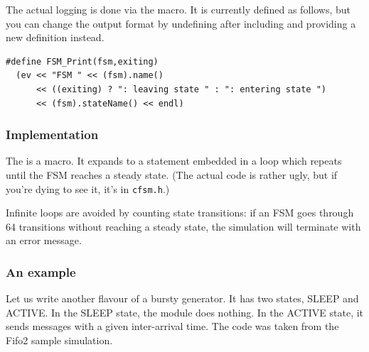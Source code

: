 The actual logging is done via the  macro.
It is currently defined as follows, but you can change the
output format by undefining  after including
 and providing a new definition instead.

\begin{verbatim}
#define FSM_Print(fsm,exiting)
  (ev << "FSM " << (fsm).name()
      << ((exiting) ? ": leaving state " : ": entering state ")
      << (fsm).stateName() << endl)
\end{verbatim}


\subsubsection{Implementation}


The  is a macro. It expands to a 
statement embedded in a  loop which repeats until the
FSM reaches a steady state. (The actual code is rather
ugly, but if you're dying to see it, it's in \texttt{cfsm.h}.)

Infinite loops are avoided by counting state transitions: if
an FSM goes through 64 transitions without reaching a steady
state, the simulation will terminate with an error message.


\subsubsection{An example}


Let us write another flavour of a bursty generator. It has two
states, SLEEP and ACTIVE. In the SLEEP state, the module does
nothing. In the ACTIVE state, it sends messages with a given
inter-arrival time. The code was taken from the Fifo2 sample
simulation.


